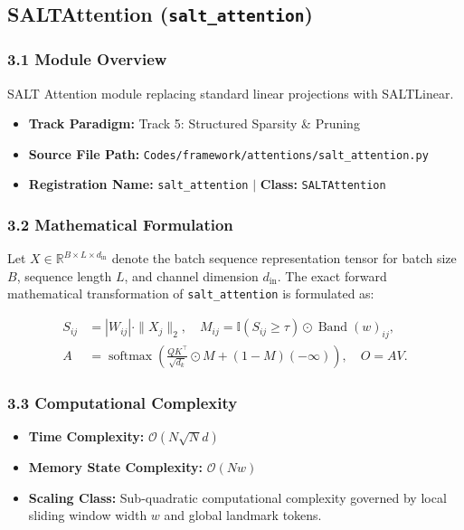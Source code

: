 \subsection{SALTAttention (\texttt{salt\_attention})}
\label{sec:app_module_salt_attention}

\subsubsection*{3.1 Module Overview}
SALT Attention module replacing standard linear projections with SALTLinear.
\begin{itemize}
    \item \textbf{Track Paradigm:} Track 5: Structured Sparsity \& Pruning
    \item \textbf{Source File Path:} \texttt{Codes/framework/attentions/salt\_attention.py}
    \item \textbf{Registration Name:} \texttt{salt\_attention} $\mid$ \textbf{Class:} \texttt{SALTAttention}
\end{itemize}

\subsubsection*{3.2 Mathematical Formulation}
Let $X \in \mathbb{R}^{B \times L \times d_{\text{in}}}$ denote the batch sequence representation tensor for batch size $B$, sequence length $L$, and channel dimension $d_{\text{in}}$. The exact forward mathematical transformation of \texttt{salt\_attention} is formulated as:

\begin{align}
S_{ij} &= |W_{ij}| \cdot \|X_j\|_2, \quad M_{ij} = \mathbb{I}(S_{ij} \ge \tau) \odot \operatorname{Band}(w)_{ij}, \\
A &= \operatorname{softmax}\left(\frac{Q K^\top}{\sqrt{d_k}} \odot M + (1 - M)(-\infty)\right), \quad O = A V.
\end{align}


\subsubsection*{3.3 Computational Complexity}
\begin{itemize}
    \item \textbf{Time Complexity:} $\mathcal{O}(N \sqrt{N} d)$
    \item \textbf{Memory State Complexity:} $\mathcal{O}(N w)$
    \item \textbf{Scaling Class:} Sub-quadratic computational complexity governed by local sliding window width $w$ and global landmark tokens.
\end{itemize}

